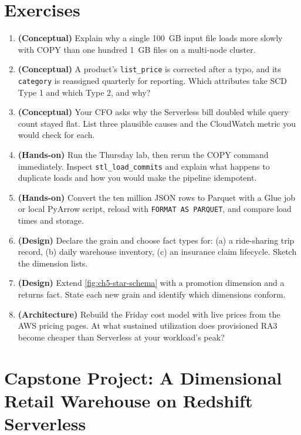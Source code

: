 \section{Exercises}
\begin{enumerate}
    \item \textbf{(Conceptual)} Explain why a single 100~GB input file loads more slowly with COPY than one hundred 1~GB files on a multi-node cluster.
    \item \textbf{(Conceptual)} A product's \texttt{list\_price} is corrected after a typo, and its \texttt{category} is reassigned quarterly for reporting. Which attributes take SCD Type 1 and which Type 2, and why?
    \item \textbf{(Conceptual)} Your CFO asks why the Serverless bill doubled while query count stayed flat. List three plausible causes and the CloudWatch metric you would check for each.
    \item \textbf{(Hands-on)} Run the Thursday lab, then rerun the COPY command immediately. Inspect \texttt{stl\_load\_commits} and explain what happens to duplicate loads and how you would make the pipeline idempotent.
    \item \textbf{(Hands-on)} Convert the ten million JSON rows to Parquet with a Glue job or local PyArrow script, reload with \texttt{FORMAT AS PARQUET}, and compare load times and storage.
    \item \textbf{(Design)} Declare the grain and choose fact types for: (a) a ride-sharing trip record, (b) daily warehouse inventory, (c) an insurance claim lifecycle. Sketch the dimension lists.
    \item \textbf{(Design)} Extend \cref{fig:ch5-star-schema} with a promotion dimension and a returns fact. State each new grain and identify which dimensions conform.
    \item \textbf{(Architecture)} Rebuild the Friday cost model with live prices from the AWS pricing pages. At what sustained utilization does provisioned RA3 become cheaper than Serverless at your workload's peak?
\end{enumerate}

\section{Capstone Project: A Dimensional Retail Warehouse on Redshift Serverless}\label{sec:ch5-capstone}

